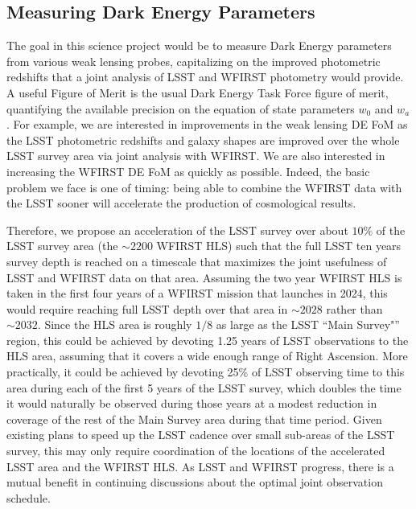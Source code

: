 
\subsection{Measuring Dark Energy Parameters}
\label{sec:\secname:targets}

The goal in this science project would be to measure Dark Energy parameters from various weak lensing
probes, capitalizing on the improved photometric redshifts that a joint
analysis of LSST and WFIRST photometry would provide. A useful
Figure of Merit is the usual Dark Energy Task Force figure of merit,
quantifying the available precision on the equation of state
parameters $w_0$ and $w_a$. For example, we are interested in
improvements in the weak lensing DE FoM as the LSST photometric redshifts
and galaxy shapes are improved over the whole LSST survey area
via joint analysis with WFIRST. We are also interested in increasing the
WFIRST DE FoM as quickly as possible.
Indeed, the basic problem we face is one of timing: being able to combine
the WFIRST data with the LSST sooner will accelerate the production of
cosmological results.

Therefore, we propose an acceleration of the LSST survey over about $10\%$ of the
LSST survey area (the $\sim2200$ WFIRST HLS) such that the full LSST ten
years survey depth is reached on a timescale that maximizes the joint
usefulness of LSST and WFIRST data on that area.  Assuming the two year
WFIRST HLS is taken in the first four years of a WFIRST mission that
launches in 2024, this would require reaching full LSST depth over that
area in $\sim2028$ rather than $\sim2032$. Since the HLS area is roughly
$1/8$ as large as the LSST ``Main Survey"'' region, this could be
achieved by devoting 1.25 years of LSST observations to the HLS area,
assuming that it covers a wide enough range of Right Ascension.  More
practically, it could be achieved by devoting 25\% of LSST observing
time to this area during each of the first 5 years of the LSST survey,
which doubles the time it would naturally be observed during those years
at a modest reduction in coverage of the rest of the Main Survey area
during that time period.   Given existing plans to speed up the LSST
cadence over small sub-areas of the LSST survey, this may only require
coordination of the locations of the accelerated LSST area and the
WFIRST HLS. As LSST and WFIRST progress, there is a mutual benefit in
continuing discussions about the optimal joint observation schedule.


